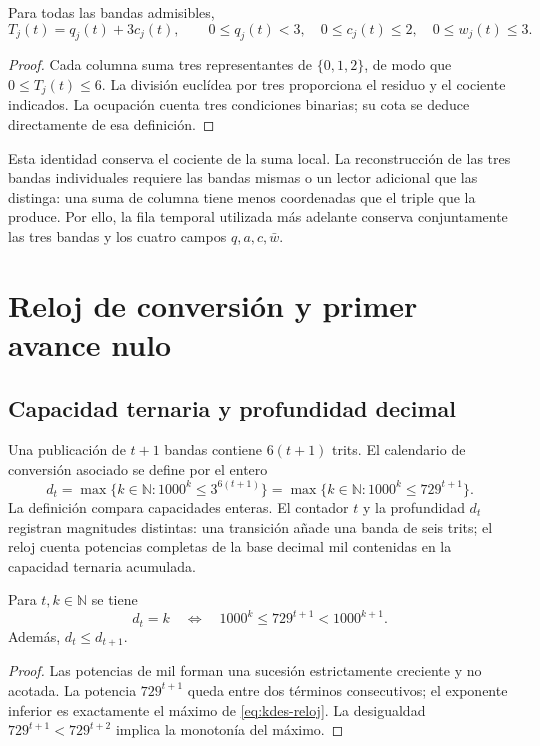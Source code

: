 \begin{proposition}
Para todas las bandas admisibles,
\[
 T_j(t)=q_j(t)+3c_j(t),\qquad
 0\leq q_j(t)<3,\quad 0\leq c_j(t)\leq2,
 \quad0\leq w_j(t)\leq3.
\]
\end{proposition}
\begin{proof}
Cada columna suma tres representantes de $\{0,1,2\}$, de modo que
$0\leq T_j(t)\leq6$. La división euclídea por tres proporciona el residuo
y el cociente indicados. La ocupación cuenta tres condiciones binarias;
su cota se deduce directamente de esa definición.
\end{proof}

Esta identidad conserva el cociente de la suma local. La reconstrucción
de las tres bandas individuales requiere las bandas mismas o un lector
adicional que las distinga: una suma de columna tiene menos coordenadas
que el triple que la produce. Por ello, la fila temporal utilizada más
adelante conserva conjuntamente las tres bandas y los cuatro campos
$q,a,c,\bar w$.

\section{Reloj de conversión y primer avance nulo}

\subsection{Capacidad ternaria y profundidad decimal}

Una publicación de $t+1$ bandas contiene $6(t+1)$ trits. El calendario
de conversión asociado se define por el entero
\begin{equation}
 d_t=\max\{k\in\mathbb N:1000^k\leq3^{6(t+1)}\}
     =\max\{k\in\mathbb N:1000^k\leq729^{t+1}\}.
 \label{eq:kdes-reloj}
\end{equation}
La definición compara capacidades enteras. El contador $t$ y la
profundidad $d_t$ registran magnitudes distintas: una transición añade
una banda de seis trits; el reloj cuenta potencias completas de la base
decimal mil contenidas en la capacidad ternaria acumulada.

\begin{lemma}
Para $t,k\in\mathbb N$ se tiene
\[
 d_t=k\quad\Longleftrightarrow\quad
 1000^k\leq729^{t+1}<1000^{k+1}.
\]
Además, $d_t\leq d_{t+1}$.
\end{lemma}
\begin{proof}
Las potencias de mil forman una sucesión estrictamente creciente y no
acotada. La potencia $729^{t+1}$ queda entre dos términos consecutivos;
el exponente inferior es exactamente el máximo de
\eqref{eq:kdes-reloj}. La desigualdad
$729^{t+1}<729^{t+2}$ implica la monotonía del máximo.
\end{proof}

